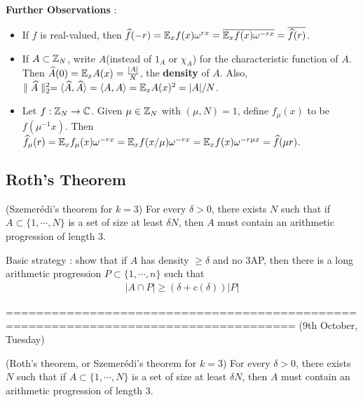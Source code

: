 \documentclass[10pt,a4paper]{report}
\renewcommand{\hat}{\widehat}
\begin{document}
\textbf{Further Observations} :

\begin{itemize}
\item If $f$ is real-valued, then $\hat{f}(-r) = \avg_x f(x) \omega^{rx} = \bar{\avg_x f(x) \omega^{-rx}} = \overline{ \hat{f}(r) }$.

\item If $A\subset \mathbb{Z}_N$, write $A$(instead of $1_A$ or $\chi_A$) for the characteristic function of $A$. Then $\hat{A}(0) = \avg_x A(x) = \frac{|A|}{N}$, the \textbf{density} of $A$. Also, $\norms{\hat{A}}{2}^2 = \langle \hat{A}, \hat{A} \rangle = \langle A,A \rangle = \avg_x A(x)^2 = |A|/N$.

\item Let $f: \mathbb{Z}_N \rightarrow \mathbb{C}$. Given $\mu \in \mathbb{Z}_N$ with $(\mu, N)=1$, define $f_{\mu}(x)$ to be $f(\mu^{-1}x)$. Then $\hat{f}_{\mu}(r) = \avg_x f_{\mu}(x)\omega^{-rx} = \avg_x f(x/\mu) \omega^{-rx} = \avg_x f(x)\omega^{-r\mu x} = \hat{f}(\mu r)$.
\end{itemize}

\subsection*{Roth's Theorem}
\s

(Szemer\'{e}di's theorem for $k=3$) For every $\delta >0$, there exists $N$ such that if $A \subset \{1, \cdots, N\}$ is a set of size at least $\delta N$, then $A$ must contain an arithmetic progression of length 3. 

\s

Basic strategy : show that if $A$ has density $\geq \delta$ and no 3AP, then there is a long arithmetic progression $P \subset \{1,\cdots,n\}$ such that
\begin{align*}
|A\cap P| \geq (\delta + c(\delta)) |P|
\end{align*}

====================================================================================
(9th October, Tuesday)
\s

(Roth's theorem, or Szemer\'{e}di's theorem for $k=3$) For every $\delta >0$, there exists $N$ such that if $A \subset \{1, \cdots, N\}$ is a set of size at least $\delta N$, then $A$ must contain an arithmetic progression of length 3. 
\s
\end{document}
